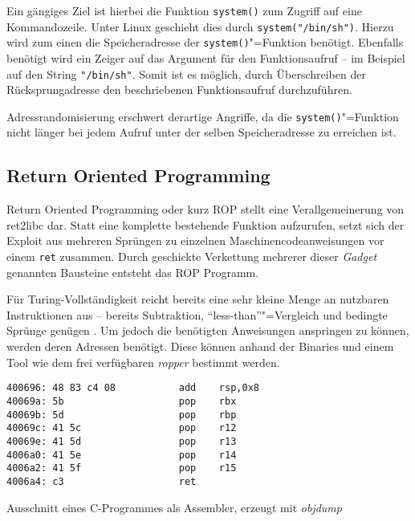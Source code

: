 \documentclass[12pt,%
               oneside,
               a4paper]{uiothesis}
\begin{document}
Ein gängiges Ziel ist hierbei die Funktion \texttt{system()} zum Zugriff auf eine Kommandozeile. Unter Linux geschieht dies durch \texttt{system("/bin/sh")}. Hierzu wird zum einen die Speicheradresse der \texttt{system()}"=Funktion benötigt. Ebenfalls benötigt wird ein Zeiger auf das Argument für den Funktionsaufruf -- im Beispiel auf den String \texttt{"/bin/sh"}. Somit ist es möglich, durch Überschreiben der Rücksprungadresse den beschriebenen Funktionsaufruf durchzuführen.


Adressrandomisierung erschwert derartige Angriffe, da die \texttt{system()}"=Funktion nicht länger bei jedem Aufruf unter der selben Speicheradresse zu erreichen ist.

\subsection{Return Oriented Programming}

Return Oriented Programming oder kurz ROP stellt eine Verallgemeinerung von ret2libc dar. Statt eine komplette bestehende Funktion aufzurufen, setzt sich der Exploit aus mehreren Sprüngen zu einzelnen Maschinencodeanweisungen vor einem \texttt{ret} zusammen. Durch geschickte Verkettung mehrerer dieser \emph{Gadget} genannten Bausteine entsteht das ROP Programm.

Für Turing-Vollständigkeit reicht bereits eine sehr kleine Menge an nutzbaren Instruktionen aus -- bereits Subtraktion, \enquote{less-than}"=Vergleich und bedingte Sprünge genügen \cite[S.3]{Homescu.2012}. Um jedoch die benötigten Anweisungen anspringen zu können, werden deren Adressen benötigt. Diese können anhand der Binaries und einem Tool wie dem frei verfügbaren \emph{ropper} bestimmt werden.

\begin{listing}
\begin{verbatim}
400696: 48 83 c4 08           add    rsp,0x8
40069a: 5b                    pop    rbx
40069b: 5d                    pop    rbp
40069c: 41 5c                 pop    r12
40069e: 41 5d                 pop    r13
4006a0: 41 5e                 pop    r14
4006a2: 41 5f                 pop    r15
4006a4: c3                    ret
\end{verbatim}
\caption{Ausschnitt eines C-Programmes als Assembler, erzeugt mit \emph{objdump}}
\label{lst:example_rop}
\end{listing}
\end{document}
